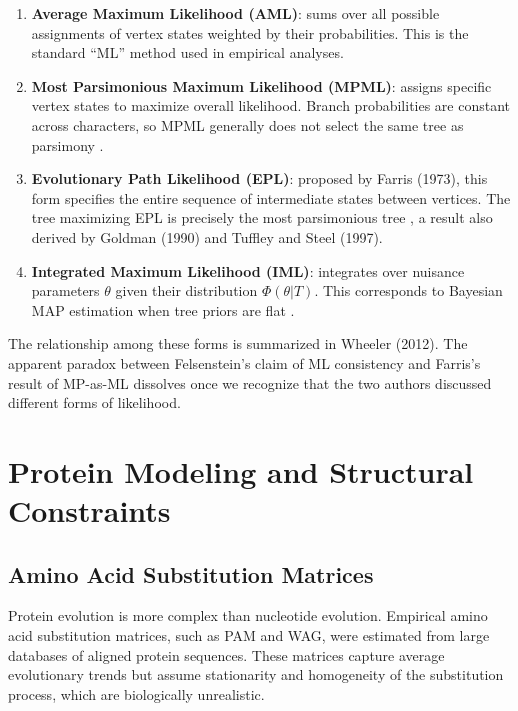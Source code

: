 \begin{enumerate}
    \item \textbf{Average Maximum Likelihood (AML)}: sums over all possible assignments of vertex states weighted by their probabilities. This is the standard ``ML'' method used in empirical analyses.

    \item \textbf{Most Parsimonious Maximum Likelihood (MPML)}: assigns specific vertex states to maximize overall likelihood. Branch probabilities are constant across characters, so MPML generally does not select the same tree as parsimony \parencite{wheeler2012}.

    \item \textbf{Evolutionary Path Likelihood (EPL)}: proposed by Farris (1973), this form specifies the entire sequence of intermediate states between vertices. The tree maximizing EPL is precisely the most parsimonious tree \parencite{wheeler2012}, a result also derived by Goldman (1990) and Tuffley and Steel (1997).

    \item \textbf{Integrated Maximum Likelihood (IML)}: integrates over nuisance parameters $\theta$ given their distribution $\Phi(\theta|T)$. This corresponds to Bayesian MAP estimation when tree priors are flat \parencite{wheeler2012,steel2000}.
\end{enumerate}

The relationship among these forms is summarized in Wheeler (2012). The apparent paradox between Felsenstein's claim of ML consistency and Farris's result of MP-as-ML dissolves once we recognize that the two authors discussed different forms of likelihood.

\section{Protein Modeling and Structural Constraints}

\subsection{Amino Acid Substitution Matrices}

Protein evolution is more complex than nucleotide evolution. Empirical amino acid substitution matrices, such as PAM and WAG, were estimated from large databases of aligned protein sequences. These matrices capture average evolutionary trends but assume stationarity and homogeneity of the substitution process, which are biologically unrealistic.


